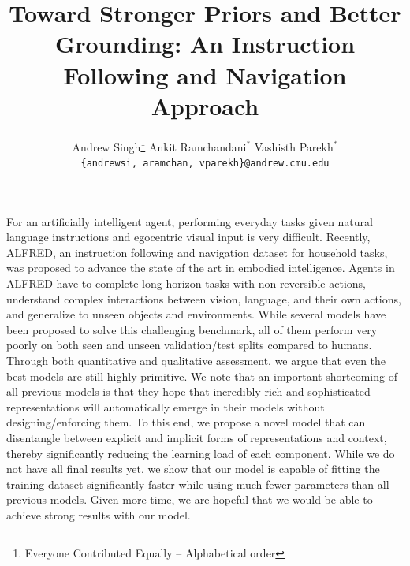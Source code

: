 \documentclass[11pt,a4paper]{article}
\title{Toward Stronger Priors and Better Grounding: An Instruction Following and Navigation Approach}
\author{
  Andrew Singh\thanks{\hspace{4pt}Everyone Contributed Equally -- Alphabetical order} \hspace{2em} Ankit Ramchandani$^*$ \hspace{2em} Vashisth Parekh$^*$ \\
  \texttt{\{andrewsi, aramchan, vparekh\}@andrew.cmu.edu}
  }
\date{}
\begin{document}
\maketitle
\begin{abstract}
\end{abstract}

For an artificially intelligent agent, performing everyday tasks given natural language instructions and egocentric visual input is very difficult. Recently, ALFRED, an instruction following and navigation dataset for household tasks, was proposed to advance the state of the art in embodied intelligence. Agents in ALFRED have to complete long horizon tasks with non-reversible actions, understand complex interactions between vision, language, and their own actions, and generalize to unseen objects and environments. While several models have been proposed to solve this challenging benchmark, all of them perform very poorly on both seen and unseen validation/test splits compared to humans. Through both quantitative and qualitative assessment, we argue that even the best models are still highly primitive. We note that an important shortcoming of all previous models is that they hope that incredibly rich and sophisticated representations will automatically emerge in their models without designing/enforcing them. To this end, we propose a novel model that can disentangle between explicit and implicit forms of representations and context, thereby significantly reducing the learning load of each component. While we do not have all final results yet, we show that our model is capable of fitting the training dataset significantly faster while using much fewer parameters than all previous models. Given more time, we are hopeful that we would be able to achieve strong results with our model.
\end{document}
